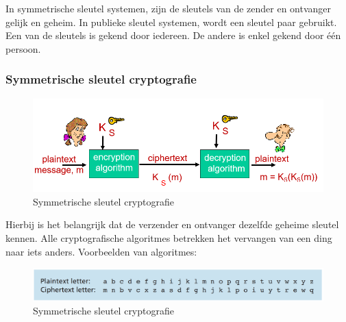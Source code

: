 \noindent In symmetrische sleutel systemen, zijn de sleutels van de zender en ontvanger gelijk en geheim.
In publieke sleutel systemen, wordt een sleutel paar gebruikt. Een van de sleutels is gekend door iedereen. De andere is enkel gekend door één persoon.

\newpage

\subsubsection{Symmetrische sleutel cryptografie}

\begin{figure}[h]
    \centering
    \includegraphics[width=7in]{./img/imghfdst8/hfdst8puntje3.png}
    \caption{Symmetrische sleutel cryptografie }      
    \label{fig:Symmetrische sleutel cryptografie }
\end{figure}

\noindent Hierbij is het belangrijk dat de verzender en ontvanger dezelfde geheime sleutel kennen.
Alle cryptografische algoritmes betrekken het vervangen van een ding naar iets anders.
Voorbeelden van algoritmes:

\begin{figure}[h]
    \centering
    \includegraphics[width=7in]{./img/imghfdst8/Figure8-3.PNG}
    \caption{Symmetrische sleutel cryptografie }      
    \label{fig:Symmetrische sleutel cryptografie }
\end{figure}

